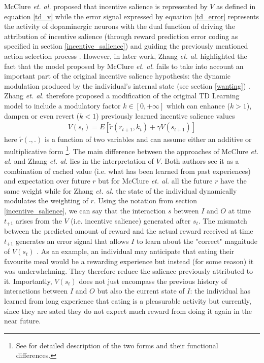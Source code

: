 
McClure \textit{et. al.} proposed that incentive salience is represented by $V$ as defined in equation \ref{td_v} while the error signal expressed by equation \ref{td_error} represents the activity of dopaminergic neurons with the dual function of driving the attribution of incentive salience (through reward prediction error coding as specified in section \ref{incentive_salience}) and guiding the previously mentioned action selection process \cite{schultz1997neural,mcclure2003computational,o2003temporal}. However, in later work, Zhang \textit{et. al.} highlighted the fact that the model proposed by McClure \textit{et. al.} fails to take into account an important part of the original incentive salience hypothesis: the dynamic modulation produced by the individual's internal state (see section \ref{wanting}) \cite{toates1994comparing,mcclure2003computational,berridge2004motivation,zhang2009neural,tindell2009dynamic,berridge2012prediction}. Zhang \textit{et. al.} therefore proposed a modification of the original TD Learning model to include a modulatory factor $k \in [0, +\infty]$ which can enhance ($k > 1$), dampen or even revert ($k < 1$) previously learned incentive salience values
\begin{align}
    \label{zhang_td_v}
    V(s_t) = E[\tilde{r}(r_{t+1},k_{t}) + \gamma V(s_{t+1})]
\end{align}
here $\tilde{r}(.,.)$ is a function of two variables and can assume either an additive or multiplicative form \footnote{See \cite{zhang2009neural} for detailed description of the two forms and their functional differences.}. The main difference between the approaches of McClure \textit{et. al.} and Zhang \textit{et. al.} lies in the interpretation of $V$. Both authors see it as a combination of cached value (i.e. what has been learned from past experiences) and expectation over future $r$ but for McClure \textit{et. al.} all the future $r$ have the same weight while for Zhang \textit{et. al.} the state of the individual dynamically modulates the weighting of $r$. Using the notation from section \ref{incentive_salience}, we can say that the interaction $s$ between $I$ and $O$ at time $t_{+1}$ arises from the $V$ (i.e. incentive salience) generated after $s_{t}$. The mismatch between the predicted amount of reward and the actual reward received at time $t_{+1}$ generates an error signal that allows $I$ to learn about the "correct" magnitude of $V(s_{t})$ \cite{schultz2017reward} . As an example, an individual may anticipate that eating their favourite meal would be a rewarding experience but instead (for some reason) it was underwhelming. They therefore reduce the salience previously attributed to it. Importantly, $V(s_{t})$ does not just encompass the previous history of interactions between $I$ and $O$ but also the current state of $I$: the individual has learned from long experience that eating is a pleasurable activity but currently, since they are sated they do not expect much reward from doing it again in the near future.  

